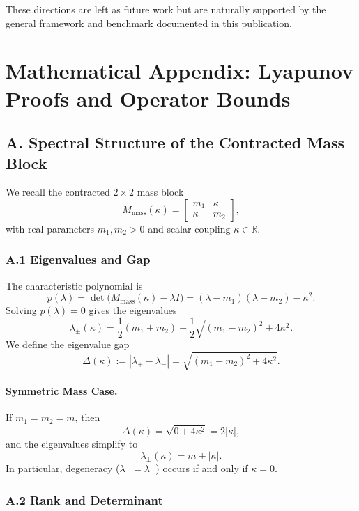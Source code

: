 \documentclass[11pt]{article}
\begin{document}
These directions are left as future work but are naturally supported by the general framework and benchmark documented in this publication.

\section*{Mathematical Appendix: Lyapunov Proofs and Operator Bounds}

\subsection*{A. Spectral Structure of the Contracted Mass Block}

We recall the contracted $2\times 2$ mass block
\[
  M_{\text{mass}}(\kappa)
  = \begin{bmatrix}
      m_1 & \kappa\\
      \kappa & m_2
    \end{bmatrix},
\]
with real parameters $m_1, m_2 > 0$ and scalar coupling $\kappa \in \mathbb{R}$.

\subsubsection*{A.1 Eigenvalues and Gap}

The characteristic polynomial is
\[
  p(\lambda)
  = \det\!\big(M_{\text{mass}}(\kappa) - \lambda I\big)
  = (\lambda - m_1)(\lambda - m_2) - \kappa^2.
\]
Solving $p(\lambda) = 0$ gives the eigenvalues
\begin{equation}
  \lambda_\pm(\kappa)
  = \frac{1}{2}(m_1 + m_2)
    \pm \frac{1}{2}\sqrt{(m_1 - m_2)^2 + 4\kappa^2}.
\end{equation}
We define the eigenvalue gap
\begin{equation}
  \Delta(\kappa)
  := |\lambda_+ - \lambda_-|
  = \sqrt{(m_1 - m_2)^2 + 4\kappa^2}.
\end{equation}

\paragraph{Symmetric Mass Case.} If $m_1 = m_2 = m$, then
\[
  \Delta(\kappa) = \sqrt{0 + 4\kappa^2} = 2|\kappa|,
\]
and the eigenvalues simplify to
\[
  \lambda_\pm(\kappa) = m \pm |\kappa|.
\]
In particular, degeneracy ($\lambda_+ = \lambda_-$) occurs if and only if $\kappa = 0$.

\subsubsection*{A.2 Rank and Determinant}
\end{document}
